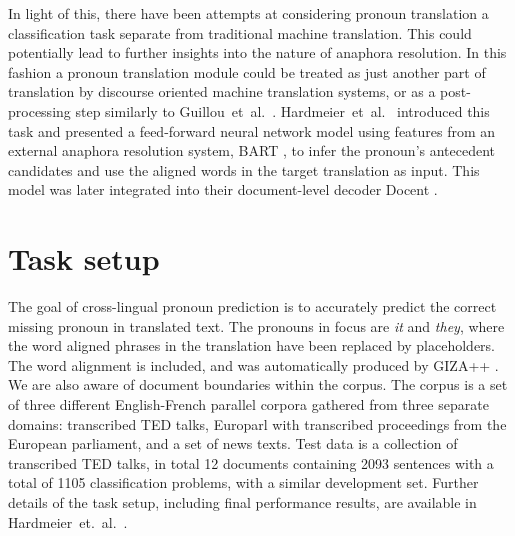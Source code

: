 \documentclass[11pt]{article}
\begin{document}
In light of this, there have been attempts at considering pronoun translation a classification task separate from traditional machine translation.
This could potentially lead to further insights into the nature of anaphora resolution.
In this fashion a pronoun translation module could be treated as just another part of translation by discourse oriented machine translation systems, or as a post-processing step similarly to Guillou~et~al.~.
Hardmeier~et~al.~ introduced this task and presented a feed-forward neural network model using features from an external anaphora resolution system, BART \cite{Broscheit2010Bart}, to infer the pronoun's antecedent candidates and use the aligned words in the target translation as input. This model was later integrated into their document-level decoder Docent \cite[chapter~9]{Hardmeier2013Docent,Hardmeier2014Discoursea}.

\section{Task setup}

The goal of cross-lingual pronoun prediction is to accurately predict the correct missing pronoun in translated text.
The pronouns in focus are \emph{it} and \emph{they}, where the word aligned phrases in the translation have been replaced by placeholders.
The word alignment is included, and was automatically produced by GIZA++ \cite{Och2003Giza}.
We are also aware of document boundaries within the corpus.
The corpus is a set of three different English-French parallel corpora gathered from three separate domains:
transcribed TED talks, Europarl \cite{Koehn2005Europarl} with transcribed proceedings from the European parliament, and a set of news texts.
Test data is a collection of transcribed TED talks, in total 12 documents containing 2093 sentences with a total of 1105 classification problems, with a similar development set. Further details of the task setup, including final performance results, are available in Hardmeier~et.~al.~.
\end{document}
